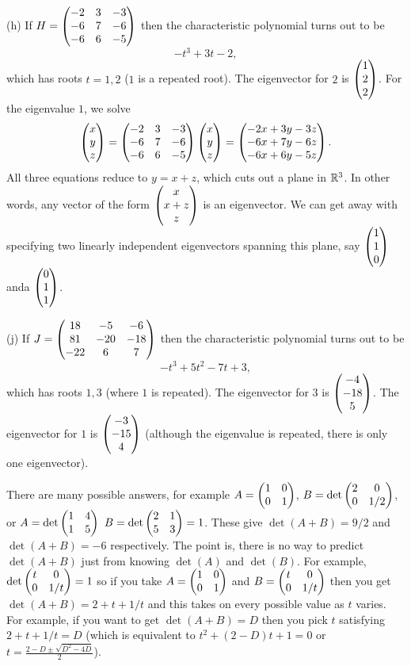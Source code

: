 \documentclass{article}
\begin{document}
\begin{Solution}
(h) If \(H=\begin{pmatrix} -2 & 3 & -3 \\ -6 & 7 & -6 \\ -6 & 6 & -5\end{pmatrix}\) then
the characteristic polynomial turns out to be \[-t^3+3t-2,\] which
has roots \(t=1,2\) (\(1\) is a repeated root). The eigenvector for
\(2\) is \(\begin{pmatrix} 1 \\ 2 \\ 2 \end{pmatrix}\). For the eigenvalue \(1\), we solve
\[\begin{pmatrix} x \\ y \\ z\end{pmatrix}=\begin{pmatrix} -2 & 3 & -3 \\ -6 & 7 & -6 \\ -6 & 6 &
-5\end{pmatrix}\begin{pmatrix} x \\ y \\ z\end{pmatrix}=\begin{pmatrix} -2x+3y-3z\\ -6x+7y-6z\\ -6x+6y-5z\end{pmatrix}.\]
All three equations reduce to \(y=x+z\), which cuts out a plane in
\(\mathbb{R}^3\). In other words, any vector of the form \(\begin{pmatrix} x \\ x+z
\\ z\end{pmatrix}\) is an eigenvector. We can get away with specifying two
linearly independent eigenvectors spanning this plane, say \(\begin{pmatrix} 1
\\ 1 \\ 0 \end{pmatrix}\) anda \(\begin{pmatrix} 0 \\ 1 \\ 1 \end{pmatrix}\).


(j) If \(J=\begin{pmatrix} 18 & -5 & -6 \\ 81 & -20 & -18 \\ -22 & 6 & 7 \end{pmatrix}\)
then the characteristic polynomial turns out to be
\[-t^3+5t^2-7t+3,\] which has roots \(1,3\) (where \(1\) is
repeated). The eigenvector for \(3\) is \(\begin{pmatrix} -4
\\ -18\\ 5\end{pmatrix}\). The eigenvector for \(1\) is \(\begin{pmatrix} -3 \\ -15
\\ 4\end{pmatrix}\) (although the eigenvalue is repeated, there is only one
eigenvector).


\end{Solution}
\begin{Solution}
There are many possible answers, for example \(A=\begin{pmatrix} 1 & 0 \\ 0 &
1\end{pmatrix}\), \(B=\det\begin{pmatrix} 2 & 0 \\ 0 & 1/2\end{pmatrix}\), or \(A=\det\begin{pmatrix} 1 & 4 \\ 1
& 5\end{pmatrix}\) \(B=\det\begin{pmatrix} 2 & 1 \\ 5 & 3\end{pmatrix}=1\). These give
\(\det(A+B)=9/2\) and \(\det(A+B)=-6\) respectively. The point is,
there is no way to predict \(\det(A+B)\) just from knowing
\(\det(A)\) and \(\det(B)\). For example, \(\det\begin{pmatrix} t & 0 \\ 0 &
1/t\end{pmatrix}=1\) so if you take \(A=\begin{pmatrix} 1 & 0 \\ 0 & 1\end{pmatrix}\) and \(B=\begin{pmatrix} t
& 0 \\ 0 & 1/t\end{pmatrix}\) then you get \(\det(A+B)=2+t+1/t\) and this
takes on every possible value as \(t\) varies. For example, if you
want to get \(\det(A+B)=D\) then you pick \(t\) satisfying
\(2+t+1/t=D\) (which is equivalent to \(t^2+(2-D)t+1=0\) or
\(t=\frac{2-D\pm\sqrt{D^2-4D}}{2}\)).


\end{Solution}
\end{document}
